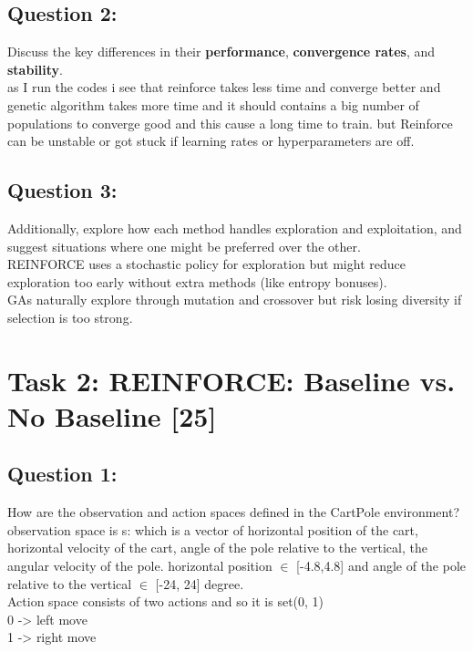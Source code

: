 \documentclass[12pt]{article}
\begin{document}
{{{				\subsection{Question 2:}
				Discuss the key differences in their \textbf{performance}, \textbf{convergence rates}, and \textbf{stability}. \\
				as I run the codes i see that reinforce takes less time and converge better and genetic algorithm takes more time and it should contains a big number of populations to converge good and this cause a long time to train. but Reinforce can be unstable or got stuck if learning rates or hyperparameters are off.
				\subsection{Question 3:}
				Additionally, explore how each method handles exploration and exploitation, and suggest situations where one might be preferred over the other. \\
				REINFORCE uses a stochastic policy for exploration but might reduce exploration too early without extra methods (like entropy bonuses).\\
				GAs naturally explore through mutation and crossover but risk losing diversity if selection is too strong.
				
				\newpage
				
				\section{Task 2: REINFORCE: Baseline vs. No Baseline [25]}
				
				\subsection{Question 1:}
				How are the observation and action spaces defined in the CartPole environment?\\
				observation space is s: which is a vector of horizontal position of the cart, horizontal velocity of the cart, angle of the pole relative to the vertical, the angular velocity of the pole.
				horizontal position $\in$ [-4.8,4.8] and angle of the pole relative to the vertical $\in$ [-24, 24] degree.\\
				Action space consists of two actions and so it is set(0, 1)\\
				0 -> left move \\
				1 -> right move \\
				\vspace*{0.3cm}
				
}}}
\end{document}
